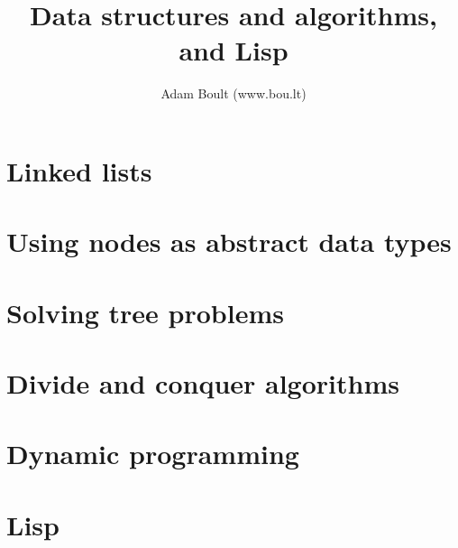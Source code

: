 \documentclass[oneside]{book}
\begin{document}
\author{Adam Boult (www.bou.lt)}
\title{Data structures and algorithms, and Lisp}
\maketitle

\setcounter{tocdepth}{0}
\tableofcontents



\part{Linked lists}



\part{Using nodes as abstract data types}



\part{Solving tree problems}







\part{Divide and conquer algorithms}


\part{Dynamic programming}




\part{Lisp}




\end{document}
